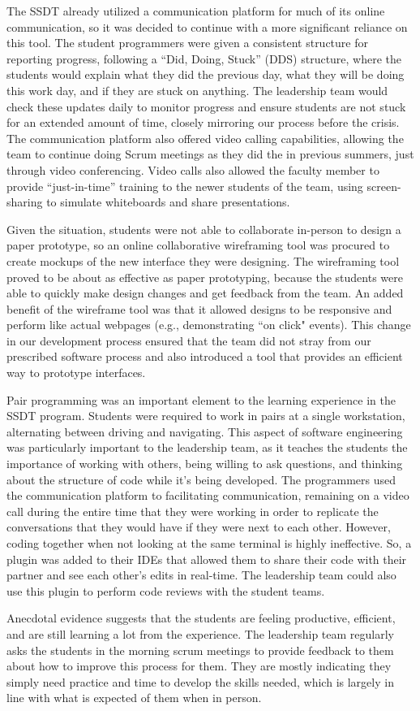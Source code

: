 The SSDT already utilized a communication platform for much of its online communication, so it was decided to continue with a more significant reliance on this tool. The student programmers were given a consistent structure for reporting progress, following a ``Did, Doing, Stuck'' (DDS) structure, where the students would explain what they did the previous day, what they will be doing this work day, and if they are stuck on anything. The leadership team would check these updates daily to monitor progress and ensure students are not stuck for an extended amount of time, closely mirroring our process before the crisis. The communication platform also offered video calling capabilities, allowing the team to continue doing Scrum meetings as they did the in previous summers, just through video conferencing. Video calls also allowed the faculty member to provide ``just-in-time'' training to the newer students of the team, using screen-sharing to simulate whiteboards and share presentations.

Given the situation, students were not able to collaborate in-person to design a paper prototype, so an online collaborative wireframing tool was procured to create mockups of the new interface they were designing. The wireframing tool proved to be about as effective as paper prototyping, because the students were able to quickly make design changes and get feedback from the team. An added benefit of the wireframe tool was that it allowed designs to be responsive and perform like actual webpages (e.g., demonstrating ``on click" events). This change in our development process ensured that the team did not stray from our prescribed software process and also introduced a tool that provides an efficient way to prototype interfaces.

Pair programming was an important element to the learning experience in the SSDT program. Students were required to work in pairs at a single workstation, alternating between driving and navigating. This aspect of software engineering was particularly important to the leadership team, as it teaches the students the importance of working with others, being willing to ask questions, and thinking about the structure of code while it's being developed. The programmers used the communication platform to facilitating communication, remaining on a video call during the entire time that they were working in order to replicate the conversations that they would have if they were next to each other. However, coding together when not looking at the same terminal is highly ineffective. So, a plugin was added to their IDEs that allowed them to share their code with their partner and see each other's edits in real-time. The leadership team could also use this plugin to perform code reviews with the student teams.

Anecdotal evidence suggests that the students are feeling productive, efficient, and are still learning a lot from the experience. The leadership team regularly asks the students in the morning scrum meetings to provide feedback to them about how to improve this process for them. They are mostly indicating they simply need practice and time to develop the skills needed, which is largely in line with what is expected of them when in person. 

